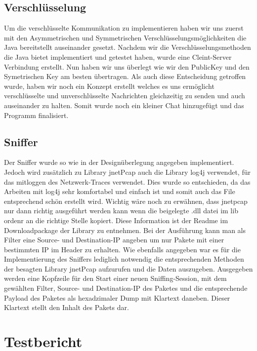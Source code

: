 \documentclass[a4paper,12pt]{scrreprt}
\begin{document}
\section{Verschlüsselung}
Um die verschlüsselte Kommunikation zu implementieren haben wir uns zuerst mit den Asymmetrischen und Symmetrischen Verschlüsselungsmöglichkeiten die Java bereitstellt auseinander gesetzt.
Nachdem wir die Verschlüsselungsmethoden die Java bietet implementiert und getestet haben, wurde eine Cleint-Server Verbindung erstellt. Nun haben wir uns überlegt wie wir den PublicKey und den Symetrischen Key am besten übertragen. 
Als auch diese Entscheidung getroffen wurde, haben wir noch ein Konzept erstellt welches es uns ermöglicht verschlüsselte und unverschlüsselte Nachrichten gleichzeitig zu senden und auch auseinander zu halten.
Somit wurde noch ein kleiner Chat hinzugefügt und das Programm finalisiert.
\section{Sniffer}
	Der Sniffer wurde so wie in der Designüberlegung angegeben implementiert. Jedoch wird zusätzlich zu Library jnetPcap auch die Library log4j verwendet, für das mitloggen des Netzwerk-Traces verwendet. Dies wurde so entschieden, da das Arbeiten mit log4j sehr komfortabel und einfach ist und somit auch das File entsprechend schön erstellt wird. Wichtig wäre noch zu erwähnen, dass jnetpcap nur dann richtig ausgeführt werden kann wenn die beigelegte .dll datei im lib ordenr an die richtige Stelle kopiert. Diese Information ist der Readme im Downloadpackage der Library zu entnehmen. 
Bei der Ausführung kann man als Filter eine Source- und Destination-IP angeben um nur Pakete mit einer bestimmten IP im Header zu erhalten. Wie ebenfalls angegeben war es für die Implementierung des Sniffers lediglich notwendig die entsprechenden Methoden der besagten Library jnetPcap aufzurufen und die Daten auszugeben. Ausgegeben werden eine Kopfzeile für den Start einer neuen Sniffing-Session, mit dem gewählten Filter, Source- und Destination-IP des Paketes und die entsprechende Payload des Paketes als hexadzimaler Dump mit Klartext daneben. Dieser Klartext stellt den Inhalt des Pakets dar. 
	
\chapter{Testbericht}
\end{document}
